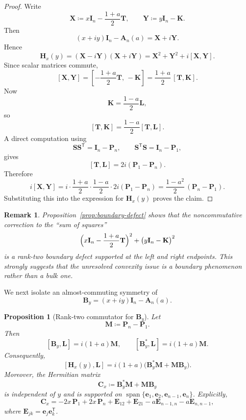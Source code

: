 \documentclass[11pt]{article}
\newtheorem{proposition}[theorem]{Proposition}
\newtheorem{remark}[theorem]{Remark}
\begin{document}
\begin{proof}
Write
\[
\mathbf X\coloneqq x\mathbf I_n-\frac{1+a}{2}\mathbf T,
\qquad
\mathbf Y\coloneqq y\mathbf I_n-\mathbf K.
\]
Then
\[
(x+iy)\mathbf I_n-\mathbf A_n(a)=\mathbf X+i\mathbf Y.
\]
Hence
\[
\mathbf H_x(y)
=
(\mathbf X-i\mathbf Y)(\mathbf X+i\mathbf Y)
=
\mathbf X^2+\mathbf Y^2+i[\mathbf X,\mathbf Y].
\]
Since scalar matrices commute,
\[
[\mathbf X,\mathbf Y]
=
\left[-\frac{1+a}{2}\mathbf T,\,-\mathbf K\right]
=
\frac{1+a}{2}\,[\mathbf T,\mathbf K].
\]
Now
\[
\mathbf K=\frac{1-a}{2}\mathbf L,
\]
so
\[
[\mathbf T,\mathbf K]=\frac{1-a}{2}[\mathbf T,\mathbf L].
\]
A direct computation using
\[
\mathbf S\mathbf S^{\mathsf T}=\mathbf I_n-\mathbf P_n,
\qquad
\mathbf S^{\mathsf T}\mathbf S=\mathbf I_n-\mathbf P_1,
\]
gives
\[
[\mathbf T,\mathbf L]
=
2i(\mathbf P_1-\mathbf P_n).
\]
Therefore
\[
i[\mathbf X,\mathbf Y]
=
i\cdot \frac{1+a}{2}\cdot \frac{1-a}{2}\cdot 2i(\mathbf P_1-\mathbf P_n)
=
\frac{1-a^2}{2}\,(\mathbf P_n-\mathbf P_1).
\]
Substituting this into the expression for \(\mathbf H_x(y)\) proves the claim.
\end{proof}

\begin{remark}
Proposition~\ref{prop:boundary-defect} shows that the noncommutative correction to the ``sum of squares''
\[
\Bigl(x\mathbf I_n-\frac{1+a}{2}\mathbf T\Bigr)^2
+
\bigl(y\mathbf I_n-\mathbf K\bigr)^2
\]
is a rank-two boundary defect supported at the left and right endpoints. This strongly suggests that the unresolved convexity issue is a boundary phenomenon rather than a bulk one.
\end{remark}

We next isolate an almost-commuting symmetry of
\[
\mathbf B_y=(x+iy)\mathbf I_n-\mathbf A_n(a).
\]

\begin{proposition}[Rank-two commutator for \(\mathbf B_y\)]\label{prop:B-commutator}
Let
\[
\mathbf M\coloneqq \mathbf P_n-\mathbf P_1.
\]
Then
\[
[\mathbf B_y,\mathbf L]=i(1+a)\mathbf M,
\qquad
[\mathbf B_y^*,\mathbf L]=i(1+a)\mathbf M.
\]
Consequently,
\[
[\mathbf H_x(y),\mathbf L]
=
i(1+a)\bigl(\mathbf B_y^*\mathbf M+\mathbf M\mathbf B_y\bigr).
\]
Moreover, the Hermitian matrix
\[
\mathbf C_x\coloneqq \mathbf B_y^*\mathbf M+\mathbf M\mathbf B_y
\]
is independent of \(y\) and is supported on \(\operatorname{span}\{\mathbf e_1,\mathbf e_2,\mathbf e_{n-1},\mathbf e_n\}\). Explicitly,
\[
\mathbf C_x
=
-2x\,\mathbf P_1
+2x\,\mathbf P_n
+\mathbf E_{12}+\mathbf E_{21}
-a\mathbf E_{n-1,n}
-a\mathbf E_{n,n-1},
\]
where \(\mathbf E_{jk}=\mathbf e_j\mathbf e_k^{\mathsf T}\).
\end{proposition}
\end{document}
